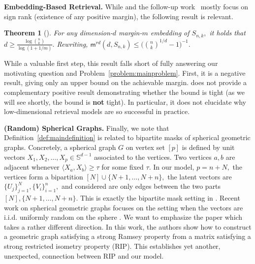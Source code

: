 \documentclass[preprint]{article}
\newtheorem{theorem}{Theorem}[section]
\newcommand{\maxmargin}{\mathsf{m}^{rd}}
\newcommand{\ksparsen}{S_{n,k}}
\begin{document}
\textbf{Embedding-Based Retrieval.} While \cite{weller2025theoretical} and the follow-up work~\cite{WangEtAl2026} mostly focus on sign rank (existence of any positive margin), the following result is relevant. 

\begin{theorem}[\cite{weller2025theoretical}]
\label{thm:spherepackinglbweller}
For any dimension-$d$ margin-$m$ embedding of $\ksparsen,$ it holds that
    $d\ge \frac{\log \binom{n}{k}}{\log(1 + 1/m)}.$ Rewriting, $\maxmargin(d,\ksparsen)\le \big({\binom{n}{k}^{1/d} - 1}\big)^{-1}.$
\end{theorem}
While a valuable first step, this result falls short of fully answering our motivating question and Problem~\ref{problem:mainproblem}. First, it is a negative result, giving only an upper bound on the achievable margin. \cite{weller2025theoretical} does not provide a complementary positive result demonstrating whether the bound is tight (as we will see shortly, the bound is \textbf{not} tight). In particular, it does not elucidate why low-dimensional retrieval models are so successful in practice.     

\textbf{(Random) Spherical Graphs.} Finally, we note that Definition~\ref{def:maindefinition} is related to bipartite masks of spherical geometric graphs. Concretely, a spherical graph $G$ on vertex set $[p]$ is defined by unit vectors $X_1, X_2, \ldots, X_p\in \mathbb{S}^{d-1}$ associated to the vertices. Two vertices $a,b$ are adjacent whenever $\langle X_a, X_b\rangle \ge \tau$ for some fixed $\tau.$ In our model, $p = n+N,$ the vertices form a bipartition $[N]\cup \{N+1, \ldots, N+n\},$ the latent vectors are $\{U_j\}_{j = 1}^N, \{V_i\}_{i = 1}^n,$ and considered are only edges between the two parts $[N], \{N+1, \ldots, N+n\}.$ This is exactly the bipartite mask setting in \cite{brennan2021finettistyleresultswishartmatrices}.
Recent work on spherical geometric graphs focuses on the setting when the vectors are i.i.d. uniformly random on the sphere \cite{bubeck2016testing,liu2023local,ma2025exponential}. We want to emphasize the paper \cite{gamarnik2020explicit} which takes a rather different direction.  In this work, the authors show how to construct a geometric graph satisfying a strong Ramsey property from a matrix satisfying a strong restricted isometry property (RIP). This establishes yet another, unexpected, connection between RIP and our model.    
\end{document}
